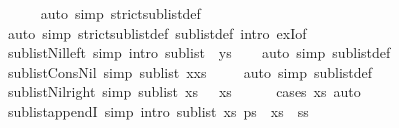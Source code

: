 \begin{isabellebody}
\ \ \ \ \isamarkupfalse%
\ {\isacharparenleft}auto\ simp{\isacharcolon}\ strict{\isacharunderscore}sublist{\isacharunderscore}def{\isacharparenright}\isanewline
{}\isamarkupfalse%
\ {\isacharparenleft}auto\ simp{\isacharcolon}\ strict{\isacharunderscore}sublist{\isacharunderscore}def\ sublist{\isacharunderscore}def\ intro{\isacharcolon}\ exI{\isacharbrackleft}of\ {\isacharunderscore}\ {\isachardoublequoteopen}{\isacharbrackleft}{\isacharbrackright}{\isachardoublequoteclose}{\isacharbrackright}{\isacharparenright}%
\endisatagproof
{\isafoldproof}%
%
\isadelimproof
\isanewline
%
\endisadelimproof
\ \ \isanewline
{}\isamarkupfalse%
\ sublist{\isacharunderscore}Nil{\isacharunderscore}left\ {\isacharbrackleft}simp{\isacharcomma}\ intro{\isacharbrackright}{\isacharcolon}\ {\isachardoublequoteopen}sublist\ {\isacharbrackleft}{\isacharbrackright}\ ys{\isachardoublequoteclose}\isanewline
%
\isadelimproof
\ \ %
\endisadelimproof
%
\isatagproof
{}\isamarkupfalse%
\ {\isacharparenleft}auto\ simp{\isacharcolon}\ sublist{\isacharunderscore}def{\isacharparenright}%
\endisatagproof
{\isafoldproof}%
%
\isadelimproof
\isanewline
%
\endisadelimproof
\ \ \ \ \isanewline
{}\isamarkupfalse%
\ sublist{\isacharunderscore}Cons{\isacharunderscore}Nil\ {\isacharbrackleft}simp{\isacharbrackright}{\isacharcolon}\ {\isachardoublequoteopen}{\isasymnot}sublist\ {\isacharparenleft}x{\isacharhash}xs{\isacharparenright}\ {\isacharbrackleft}{\isacharbrackright}{\isachardoublequoteclose}\isanewline
%
\isadelimproof
\ \ %
\endisadelimproof
%
\isatagproof
{}\isamarkupfalse%
\ {\isacharparenleft}auto\ simp{\isacharcolon}\ sublist{\isacharunderscore}def{\isacharparenright}%
\endisatagproof
{\isafoldproof}%
%
\isadelimproof
\isanewline
%
\endisadelimproof
\ \ \ \ \isanewline
{}\isamarkupfalse%
\ sublist{\isacharunderscore}Nil{\isacharunderscore}right\ {\isacharbrackleft}simp{\isacharbrackright}{\isacharcolon}\ {\isachardoublequoteopen}sublist\ xs\ {\isacharbrackleft}{\isacharbrackright}\ {\isasymlongleftrightarrow}\ xs\ {\isacharequal}\ {\isacharbrackleft}{\isacharbrackright}{\isachardoublequoteclose}\isanewline
%
\isadelimproof
\ \ %
\endisadelimproof
%
\isatagproof
{}\isamarkupfalse%
\ {\isacharparenleft}cases\ xs{\isacharparenright}\ auto%
\endisatagproof
{\isafoldproof}%
%
\isadelimproof
\isanewline
%
\endisadelimproof
\ \ \ \ \isanewline
{}\isamarkupfalse%
\ sublist{\isacharunderscore}appendI\ {\isacharbrackleft}simp{\isacharcomma}\ intro{\isacharbrackright}{\isacharcolon}\ {\isachardoublequoteopen}sublist\ xs\ {\isacharparenleft}ps\ {\isacharat}\ xs\ {\isacharat}\ ss{\isacharparenright}{\isachardoublequoteclose}\isanewline

\end{isabellebody}
